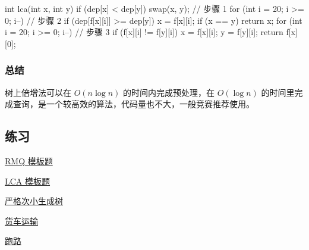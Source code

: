 \begin{cppcode}
int lca(int x, int y) {
  if (dep[x] < dep[y]) swap(x, y);  // 步骤 1
  for (int i = 20; i >= 0; i--)     // 步骤 2
  {
    if (dep[f[x][i]] >= dep[y]) x = f[x][i];
    if (x == y) return x;
  }
  for (int i = 20; i >= 0; i--)  // 步骤 3
    if (f[x][i] != f[y][i]) {
      x = f[x][i];
      y = f[y][i];
    }
  return f[x][0];
}
\end{cppcode}

\subsubsection{总结}

树上倍增法可以在 $O(n\log n)$ 的时间内完成预处理，在 $O(\log n)$ 的时间里完成查询，是一个较高效的算法，代码量也不大，一般竞赛推荐使用。

\subsection{练习}

\href{https://www.luogu.org/problemnew/show/P3865}{RMQ 模板题}

\href{https://www.luogu.org/problemnew/show/P3379}{LCA 模板题}

\href{https://www.luogu.org/problemnew/show/P4180}{严格次小生成树}

\href{https://www.luogu.org/problemnew/show/P1967}{货车运输}

\href{https://www.luogu.org/problemnew/show/P1613}{跑路}
